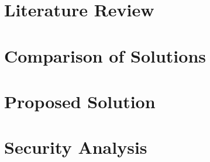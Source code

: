 \documentclass[10pt]{report}
\newif\ifnotesincluded
\begin{document}
\chapter{Literature Review} \label{chapterBackground}


\chapter{Comparison of Solutions} \label{chapterComparison}





\chapter{Proposed Solution} \label{chapterTheoreticalSolution}






\chapter{Security Analysis} \label{chapterSecurityAnalysis}



\fi


\ifnotesincluded
\chapter{Practical Implementation} \label{chapterPracticalImplementation}

\chapter{Conclusion and Further Work} \label{chapterConclusion}

\fi

\begin{sloppypar}
\printbibliography
\end{sloppypar}
\end{document}
